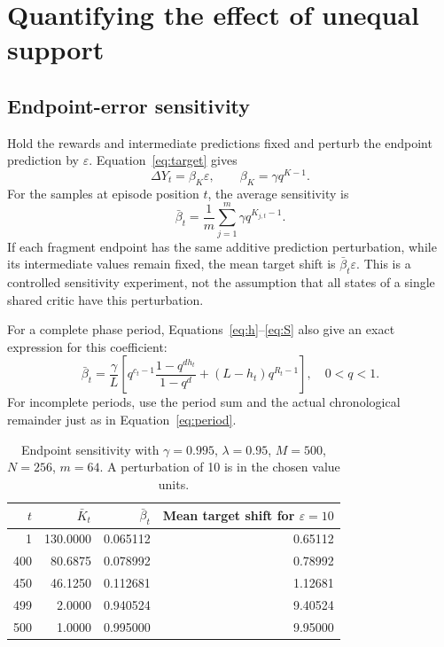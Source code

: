 \documentclass[11pt,a4paper]{article}
\numberwithin{equation}{section}
\begin{document}
\section{Quantifying the effect of unequal support}
\subsection{Endpoint-error sensitivity}
Hold the rewards and intermediate predictions fixed and perturb the endpoint
prediction by $\varepsilon$. Equation~\eqref{eq:target} gives
\begin{equation}\label{eq:sensitivity}
 \boxed{\Delta Y_t=\beta_K\varepsilon,\qquad
 \beta_K=\gamma q^{K-1}.}
\end{equation}
For the samples at episode position $t$, the average sensitivity is
\begin{equation}
 \bar\beta_t=\frac1m\sum_{j=1}^{m}\gamma q^{K_{j,t}-1}.
\end{equation}
If each fragment endpoint has the same additive prediction perturbation,
while its intermediate values remain fixed, the mean target shift is
$\bar\beta_t\varepsilon$. This is a controlled sensitivity experiment, not the
assumption that all states of a single shared critic have this perturbation.

For a complete phase period, Equations~\eqref{eq:h}--\eqref{eq:S} also give
an exact expression for this coefficient:
\begin{equation}\label{eq:betaclosed}
 \boxed{\bar\beta_t=\frac{\gamma}{L}\left[
 q^{c_t-1}\frac{1-q^{d h_t}}{1-q^d}
 +(L-h_t)q^{R_t-1}\right],\quad 0<q<1.}
\end{equation}
For incomplete periods, use the period sum and the actual chronological remainder
just as in Equation~\eqref{eq:period}.

\begin{table}[htbp]\centering
\caption{Endpoint sensitivity with $\gamma=0.995$, $\lambda=0.95$, $M=500$,
$N=256$, $m=64$. A perturbation of 10 is in the chosen value units.}
\begin{tabular}{rrrr}\toprule
$t$ & $\bar K_t$ & $\bar\beta_t$ & Mean target shift for $\varepsilon=10$ \\\midrule
1 & 130.0000 & 0.065112 & 0.65112 \\
400 & 80.6875 & 0.078992 & 0.78992 \\
450 & 46.1250 & 0.112681 & 1.12681 \\
499 & 2.0000 & 0.940524 & 9.40524 \\
500 & 1.0000 & 0.995000 & 9.95000 \\\bottomrule
\end{tabular}
\end{table}
\end{document}
